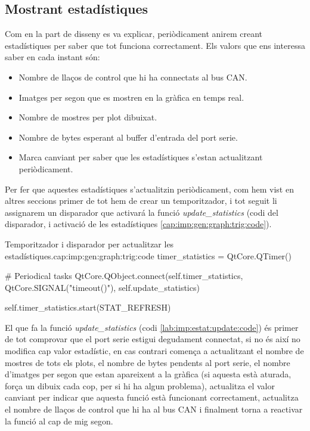 \FloatBarrier

\subsection{Mostrant estadístiques}\label{cap:imp:estat}

Com en la part de disseny es va explicar, periòdicament anirem creant estadístiques per saber que tot funciona correctament. 
Els valors que ens interessa saber en cada instant són: 

\begin{itemize}
	\item Nombre de llaços de control que hi ha connectats al bus CAN.
	\item Imatges per segon que es mostren en la gràfica en temps real.
	\item Nombre de mostres per plot dibuixat.
	\item Nombre de bytes esperant al buffer d'entrada del port serie.
	\item Marca canviant per saber que les estadístiques s'estan actualitzant periòdicament.
\end{itemize}

Per fer que aquestes estadístiques s'actualitzin periòdicament, com hem vist en altres seccions primer de tot hem de crear un temporitzador, i tot seguit li assignarem un disparador que activará la funció \emph{update\_statistics} (codi del disparador, i activació de les estadístiques \ref{cap:imp:gen:graph:trig:code}).

\begin{code_python}{Temporitzador i disparador per actualitzar les estadístiques.}{cap:imp:gen:graph:trig:code}
timer_statistics = QtCore.QTimer()

# Periodical tasks
QtCore.QObject.connect(self.timer_statistics, QtCore.SIGNAL("timeout()"), self.update_statistics)

self.timer_statistics.start(STAT_REFRESH)
\end{code_python}

El que fa la funció \emph{update\_statistics} (codi \ref{lab:imp:estat:update:code}) és primer de tot comprovar que el port serie estigui degudament connectat, si no és així no modifica cap valor estadístic, en cas contrari comença a actualitzant el nombre de mostres de tots els plots, el nombre de bytes pendents al port serie, el nombre d'imatges per segon que estan apareixent a la gràfica (si aquesta està aturada, força un dibuix cada cop, per si hi ha algun problema), actualitza el valor canviant per indicar que aquesta funció està funcionant correctament, actualitza el nombre de llaços de control que hi ha al bus CAN i finalment torna a reactivar la funció al cap de mig segon.


